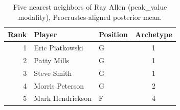 \begin{table}[htbp]
  \centering\small
  \begin{tabular}{rllc}
    \toprule
    Rank & Player & Position & Archetype \\
    \midrule
    1 & Eric Piatkowski & G & 1 \\
    2 & Patty Mills & G & 1 \\
    3 & Steve Smith & G & 1 \\
    4 & Morris Peterson & G & 2 \\
    5 & Mark Hendrickson & F & 4 \\
    \bottomrule
  \end{tabular}
  \caption{Five nearest neighbors of Ray Allen (peak_value modality), Procrustes-aligned posterior mean.}
  \label{tab:Ray_Allen_neighbors_peak_value}
\end{table}

